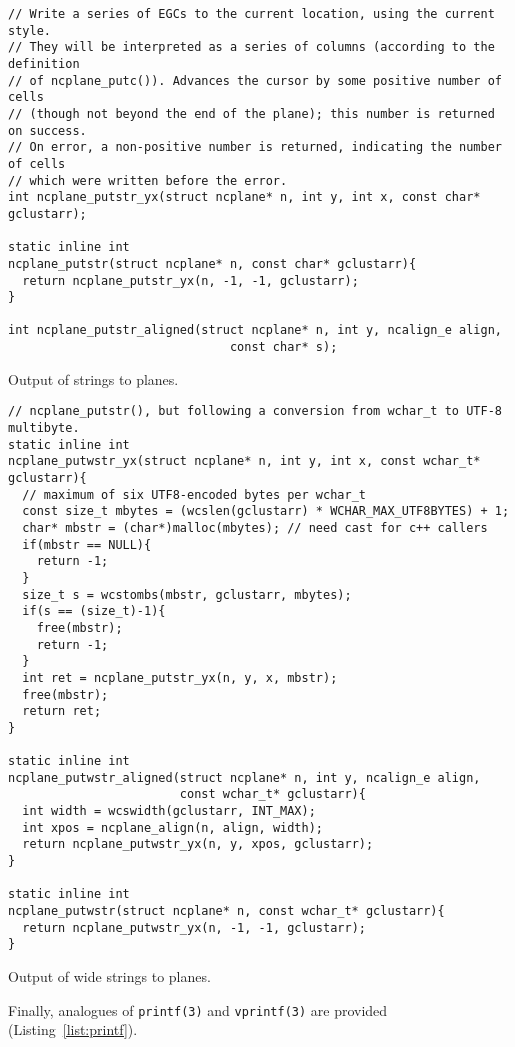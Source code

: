 \begin{listing}[!htbp]
\begin{verbatim}
// Write a series of EGCs to the current location, using the current style.
// They will be interpreted as a series of columns (according to the definition
// of ncplane_putc()). Advances the cursor by some positive number of cells
// (though not beyond the end of the plane); this number is returned on success.
// On error, a non-positive number is returned, indicating the number of cells
// which were written before the error.
int ncplane_putstr_yx(struct ncplane* n, int y, int x, const char* gclustarr);

static inline int
ncplane_putstr(struct ncplane* n, const char* gclustarr){
  return ncplane_putstr_yx(n, -1, -1, gclustarr);
}

int ncplane_putstr_aligned(struct ncplane* n, int y, ncalign_e align,
                               const char* s);
\end{verbatim}
\caption{Output of strings to planes.}
\label{list:putstr}
\end{listing}

\begin{listing}[!htbp]
\begin{verbatim}
// ncplane_putstr(), but following a conversion from wchar_t to UTF-8 multibyte.
static inline int
ncplane_putwstr_yx(struct ncplane* n, int y, int x, const wchar_t* gclustarr){
  // maximum of six UTF8-encoded bytes per wchar_t
  const size_t mbytes = (wcslen(gclustarr) * WCHAR_MAX_UTF8BYTES) + 1;
  char* mbstr = (char*)malloc(mbytes); // need cast for c++ callers
  if(mbstr == NULL){
    return -1;
  }
  size_t s = wcstombs(mbstr, gclustarr, mbytes);
  if(s == (size_t)-1){
    free(mbstr);
    return -1;
  }
  int ret = ncplane_putstr_yx(n, y, x, mbstr);
  free(mbstr);
  return ret;
}

static inline int
ncplane_putwstr_aligned(struct ncplane* n, int y, ncalign_e align,
                        const wchar_t* gclustarr){
  int width = wcswidth(gclustarr, INT_MAX);
  int xpos = ncplane_align(n, align, width);
  return ncplane_putwstr_yx(n, y, xpos, gclustarr);
}

static inline int
ncplane_putwstr(struct ncplane* n, const wchar_t* gclustarr){
  return ncplane_putwstr_yx(n, -1, -1, gclustarr);
}
\end{verbatim}
\caption{Output of wide strings to planes.}
\label{list:wputstr}
\end{listing}

Finally, analogues of \texttt{printf(3)} and \texttt{vprintf(3)} are provided (Listing~\ref{list:printf}).

